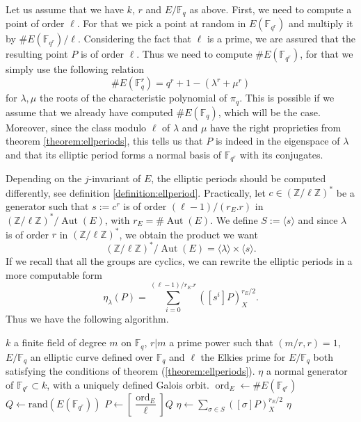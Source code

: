 \documentclass[12pt]{article}
\theoremstyle{plain}
\theoremstyle{definition}
\DeclareMathOperator{\order}{ord} %
\DeclareMathOperator{\Aut}{Aut}
\def\Z{\ensuremath{\mathbb{Z}}}
\def\F{\ensuremath{\mathbb{F}}}
\newcounter{algorithm}
\begin{document}
Let us assume that we have $k$, $r$ and $E/\F_q$ as above. First, we need to 
compute a point of order $\ell$. For that we pick a point at random 
in $E(\F_{q^r})$ and multiply it by $\#E(\F_{q^r})/\ell$. Considering the fact 
that $\ell$ is a prime, we are assured that the resulting point $P$ is of order 
$\ell$. Thus we need to compute $\#E(\F_{q^r})$, for that we simply use the 
following relation
\begin{equation}
\#E(\F_q^r)=q^r+1-(\lambda^r+\mu^r)
\end{equation}
for $\lambda, \mu$ the roots of the characteristic polynomial of $\pi_q$. This
is possible if we assume that we already have computed
$\#E(\F_q)$, which will be the case. Moreover, since the class modulo $\ell$ of
$\lambda$ and $\mu$ have the right proprieties from theorem 
\ref{theorem:ellperiods}, this tells us that $P$ is indeed in 
the eigenspace of $\lambda$ and that its elliptic period forms a normal basis of
$\F_{q^r}$ with its conjugates. 

Depending on the $j$-invariant of $E$, the elliptic periods should be computed 
differently, see definition \ref{definition:ellperiod}. Practically, let 
$c\in(\Z/\ell\Z)^{\ast}$ be a generator such that $s:=c^r$ is of order 
$(\ell-1)/(r_E.r)$ in $(\Z/\ell\Z)^{\ast}/\Aut(E)$, with 
$r_E=\#\Aut(E)$. We define $S:=\langle{s}\rangle$ and since $\lambda$ 
is of order $r$ in $(\Z/\ell\Z)^{\ast}$, we obtain the product we want
\[
(\Z/\ell\Z)^{\ast}/\Aut(E)=\langle{\lambda}\rangle\times\langle{s}\rangle.
\]
If we recall that all the groups are cyclics, we can rewrite the elliptic 
periods in a more computable form
\begin{equation}
\eta_\lambda(P)=\sum_{i=0}^{(\ell-1)/r_E.r}
{\left([s^i]P\right)_X^{r_E/2}}.
\end{equation}
Thus we have the following algorithm.

\begin{algorithm}
\label{algorithm:compell}
    \begin{algorithmic}[1]
    \REQUIRE $k$ a finite field of degree $m$ on $\F_q$, $r|m$ a prime power
such that $(m/r,r) = 1$, $E/\F_q$ an elliptic curve defined over $\F_q$ and 
$\ell$ the Elkies prime for $E/\F_q$ both satisfying the conditions of theorem
(\ref{theorem:ellperiods}).
    \ENSURE $\eta$ a normal generator of $\F_{q^r}\subset k$, with a uniquely
defined Galois orbit.
    \STATE $\order_E\leftarrow\#E(\F_{q^r})$
    \REPEAT
        \STATE $Q\leftarrow\text{rand}(E(\F_{q^r}))$
        \STATE $P\leftarrow[\dfrac{\order_E}{\ell}]Q$
    \STATE $\eta\leftarrow\sum_{\sigma\in S}{\left([\sigma]P\right)_X^{r_E/2}}$
    \RETURN $\eta$
    \end{algorithmic}
\end{algorithm}
\end{document}
